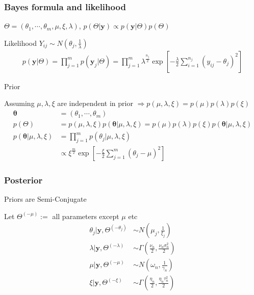     \subsubsection{Bayes formula and likelihood}

    $\Theta = (\theta_1, \cdots, \theta_m, \mu, \xi, \lambda)$,
    $p(\Theta|\mathbf{y})\propto p(\mathbf{y}|\Theta)p(\Theta)$

    Likelihood $Y_{ij} \sim N(\theta_j, \frac{1}{\lambda})$
    \begin{align*}
        p(\mathbf{y}|\Theta)
        = \prod_{j=1}^m p(\mathbf{y}_j|\Theta)
        = \prod_{j=1}^m \lambda^{\frac{n_j}{2}}
        \exp\left[
            -\frac{\lambda}{2} \sum_{i=1}^{n_j}
            (y_{ij}-\theta_j)^2
        \right]
    \end{align*}

    Prior

    Assuming $\mu, \lambda, \xi$ are independent in prior
    $\Rightarrow p(\mu, \lambda, \xi) = p(\mu)p(\lambda)p(\xi)$
    \begin{align*}
        \mathbf{\theta}
        & = (\theta_1, \cdots, \theta_m)\\
        p(\Theta)
        & = p(\mu, \lambda, \xi)p(\mathbf{\theta}|\mu, \lambda, \xi)
        =p(\mu)p(\lambda)p(\xi)p(\mathbf{\theta}|\mu,
        \lambda, \xi)\\
        p(\mathbf{\theta}|\mu, \lambda, \xi)
        & = \prod_{j=1}^m p(\theta_j|\mu, \lambda, \xi)\\
        & \propto \xi^{\frac{m}{2}}\exp\left[
            -\frac{\xi}{2} \sum_{j=1}^m (\theta_j - \mu)^2
        \right]
    \end{align*}


    
    \subsubsection{Posterior}

    Priors are Semi-Conjugate

    Let $\Theta^{(-\mu)} :=$ all parameters except $\mu$ etc
    \begin{align*}
        \theta_j | \mathbf{y}, \Theta^{(-\theta_j)}
            & \sim N\left(\mu_j, \frac{1}{\xi_j}\right)\\
        \lambda | \mathbf{y}, \Theta^{(-\lambda)}
            & \sim \Gamma\left(\frac{\nu_n}{2},
            \frac{\nu_n\sigma_n^2}{2}\right)\\
        \mu | \mathbf{y}, \Theta^{(-\mu)}
            & \sim N\left(\omega_n, \frac{1}{\gamma_n}\right)\\
        \xi | \mathbf{y}, \Theta^{(-\xi)}
            & \sim \Gamma\left(\frac{\eta_n}{2},
            \frac{\eta_n\tau_n^2}{2}\right)
    \end{align*}

